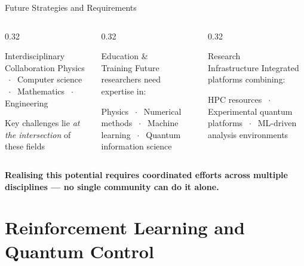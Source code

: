\documentclass[aspectratio=169]{beamer}
\begin{document}
\begin{frame}{Future Strategies and Requirements}

  \begin{columns}[T]
    \begin{column}{0.32\textwidth}
      \begin{block}{\centering Interdisciplinary\\Collaboration}
        \centering\medskip
        Physics $\;\cdot\;$ Computer science $\;\cdot\;$
        Mathematics $\;\cdot\;$ Engineering
        \medskip

        \small Key challenges lie \emph{at the intersection}
        of these fields
      \end{block}
    \end{column}
    \begin{column}{0.32\textwidth}
      \begin{block}{\centering Education \&\\Training}
        \centering\medskip
        Future researchers need expertise in:
        \medskip

        \small Physics $\;\cdot\;$ Numerical methods $\;\cdot\;$
        Machine learning $\;\cdot\;$ Quantum information science
      \end{block}
    \end{column}
    \begin{column}{0.32\textwidth}
      \begin{block}{\centering Research\\Infrastructure}
        \centering\medskip
        Integrated platforms combining:
        \medskip

        \small HPC resources $\;\cdot\;$ Experimental quantum platforms $\;\cdot\;$
        ML-driven analysis environments
      \end{block}
    \end{column}
  \end{columns}

  \bigskip
  \begin{center}
    \textcolor{mqblue}{\bfseries
    Realising this potential requires coordinated efforts across
    multiple disciplines — no single community can do it alone.}
  \end{center}

\end{frame}


\section{Reinforcement Learning and Quantum Control}
\end{document}
